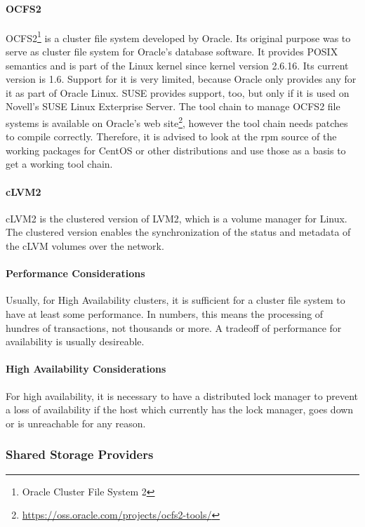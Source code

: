 \paragraph{OCFS2}
OCFS2\footnote{Oracle Cluster File System 2} is a cluster file system developed by Oracle.
Its original purpose was to serve as cluster file system for Oracle's database software.
It provides POSIX semantics and is part of the Linux kernel since kernel version 2.6.16. 
\linebreak[3]
Its current version is 1.6. Support for it is very limited, because Oracle only
provides any for it as part of Oracle Linux. SUSE provides support, too, but only
if it is used on Novell's SUSE Linux Exterprise Server. The tool chain to manage
OCFS2 file systems is available on Oracle's web site\footnote{\url{https://oss.oracle.com/projects/ocfs2-tools/}},
however the tool chain needs patches to compile correctly. Therefore, it is advised
to look at the rpm source of the working packages for CentOS or other distributions and use those as a basis
to get a working tool chain.
\paragraph{cLVM2}
cLVM2 is the clustered version of LVM2, which is a volume manager for Linux.
The clustered version enables the synchronization of the status and metadata
of the cLVM volumes over the network.

\paragraph{Performance Considerations}
Usually, for High Availability clusters, it is sufficient for a cluster file system
to have at least some performance. In numbers, this means the processing of 
hundres of transactions, not thousands or more. A tradeoff of performance for
availability is usually desireable.

\paragraph{High Availability Considerations}
For high availability, it is necessary to have a distributed lock manager to prevent
a loss of availability if the host which currently has the lock manager, goes down or
is unreachable for any reason.
\subsubsection{Shared Storage Providers}
